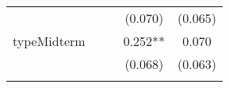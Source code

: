 \documentclass[12pt,twoside]{reedthesis}
\begin{document}
\begin{longtable}[]{@{}lcccc@{}}
  \begin{minipage}[t]{0.26\columnwidth}\raggedright\strut
  \strut
  \end{minipage} & \begin{minipage}[t]{0.12\columnwidth}\centering\strut
  \strut
  \end{minipage} & \begin{minipage}[t]{0.13\columnwidth}\centering\strut
  \strut
  \end{minipage} & \begin{minipage}[t]{0.14\columnwidth}\centering\strut
  (0.070)\strut
  \end{minipage} & \begin{minipage}[t]{0.14\columnwidth}\centering\strut
  (0.065)\strut
  \end{minipage}\tabularnewline
  \begin{minipage}[t]{0.26\columnwidth}\raggedright\strut
  typeMidterm\strut
  \end{minipage} & \begin{minipage}[t]{0.12\columnwidth}\centering\strut
  \strut
  \end{minipage} & \begin{minipage}[t]{0.13\columnwidth}\centering\strut
  \strut
  \end{minipage} & \begin{minipage}[t]{0.14\columnwidth}\centering\strut
  0.252**\strut
  \end{minipage} & \begin{minipage}[t]{0.14\columnwidth}\centering\strut
  0.070\strut
  \end{minipage}\tabularnewline
  \begin{minipage}[t]{0.26\columnwidth}\raggedright\strut
  \strut
  \end{minipage} & \begin{minipage}[t]{0.12\columnwidth}\centering\strut
  \strut
  \end{minipage} & \begin{minipage}[t]{0.13\columnwidth}\centering\strut
  \strut
  \end{minipage} & \begin{minipage}[t]{0.14\columnwidth}\centering\strut
  (0.068)\strut
  \end{minipage} & \begin{minipage}[t]{0.14\columnwidth}\centering\strut
  (0.063)\strut
  \end{minipage}\tabularnewline
  \begin{minipage}[t]{0.26\columnwidth}\raggedright\strut

\end{minipage}
\end{longtable}
\end{document}
